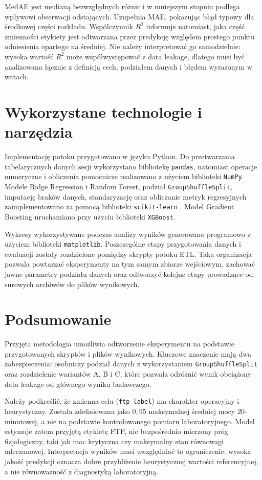 MedAE jest medianą bezwzględnych różnic i w mniejszym stopniu podlega wpływowi obserwacji odstających. Uzupełnia MAE, pokazując błąd typowy dla środkowej części rozkładu. Współczynnik $R^2$ informuje natomiast, jaka część zmienności etykiety jest odtwarzana przez predykcję względem prostego punktu odniesienia opartego na średniej. Nie należy interpretować go samodzielnie: wysoka wartość $R^2$ może współwystępować z data leakage, dlatego musi być analizowana łącznie z definicją cech, podziałem danych i błędem wyrażonym w watach.

\section{Wykorzystane technologie i narzędzia}

Implementację potoku przygotowano w języku Python. Do przetwarzania tabelarycznych danych sesji wykorzystano bibliotekę \texttt{pandas}, natomiast operacje numeryczne i obliczenia pomocnicze realizowano z użyciem biblioteki \texttt{NumPy}. Modele Ridge Regression i Random Forest, podział \texttt{GroupShuffleSplit}, imputację braków danych, standaryzację oraz obliczanie metryk regresyjnych zaimplementowano za pomocą biblioteki \texttt{scikit-learn} \parencite{pedregosa2011scikitLearn}. Model Gradient Boosting uruchamiano przy użyciu biblioteki \texttt{XGBoost}.

Wykresy wykorzystywane podczas analizy wyników generowano programowo z użyciem biblioteki \texttt{matplotlib}. Poszczególne etapy przygotowania danych i ewaluacji zostały rozdzielone pomiędzy skrypty potoku ETL. Taka organizacja pozwala powtarzać eksperymenty na tym samym zbiorze wejściowym, zachować jawne parametry podziału danych oraz odtworzyć kolejne etapy prowadzące od surowych archiwów do plików wynikowych.

\section{Podsumowanie}

Przyjęta metodologia umożliwia odtworzenie eksperymentu na podstawie przygotowanych skryptów i plików wynikowych. Kluczowe znaczenie mają dwa zabezpieczenia: osobniczy podział danych z wykorzystaniem \texttt{GroupShuffleSplit} oraz rozdzielenie wariantów A, B i C, które pozwala odróżnić wynik obciążony data leakage od głównego wyniku badawczego.

Należy podkreślić, że zmienna celu (\texttt{ftp\_label}) ma charakter operacyjny i heurystyczny. Została zdefiniowana jako $0{,}95$ maksymalnej średniej mocy 20-minutowej, a nie na podstawie kontrolowanego pomiaru laboratoryjnego. Model estymuje zatem przyjętą etykietę FTP, nie bezpośrednio mierzony próg fizjologiczny, taki jak moc krytyczna czy maksymalny stan równowagi mleczanowej. Interpretacja wyników musi uwzględniać to ograniczenie: wysoka jakość predykcji oznacza dobre przybliżenie heurystycznej wartości referencyjnej, a nie równoważność z diagnostyką laboratoryjną.
